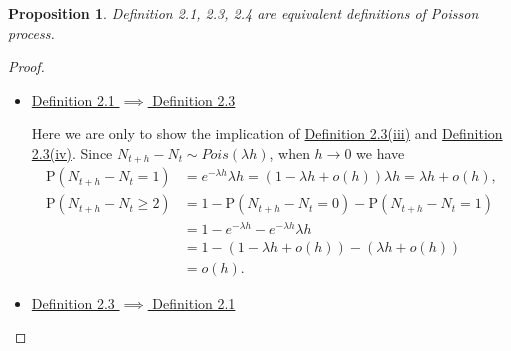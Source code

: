 \documentclass{article}
\newtheorem{proposition}{Proposition}[section]
\theoremstyle{nonumberplain}
\newtheorem{proof}{Proof.}
\begin{document}
\begin{proposition}
	Definition 2.1, 2.3, 2.4 are equivalent definitions of Poisson process.
\end{proposition}
\begin{proof}~\\
	\vspace{-1em}
	\begin{itemize}
	\item \underline{Definition 2.1 $\implies$ Definition 2.3} 
	
	Here we are only to show the implication of \hyperlink{Definition 2.3(iii)}{Definition 2.3(iii)} and \hyperlink{Definition 2.3(iv)}{Definition 2.3(iv)}. Since $N_{t+h}-N_t\sim Pois(\lambda h)$, when $h\to0$ we have 
	\begin{align*}
		\mathrm{P}(N_{t+h}-N_t=1)&=e^{-\lambda h}\lambda h=(1-\lambda h+o(h))\lambda h=\lambda h+o(h),\\
		\mathrm{P}(N_{t+h}-N_t\ge2)&=1-\mathrm{P}(N_{t+h}-N_t=0)-\mathrm{P}(N_{t+h}-N_t=1)\\
		&=1-e^{-\lambda h}-e^{-\lambda h}\lambda h\\
		&=1-(1-\lambda h+o(h))-(\lambda h+o(h))\\
		&=o(h).
	\end{align*}
	\item\underline{Definition 2.3 $\implies$ Definition 2.1} 
	

\end{itemize}
\end{proof}
\end{document}
